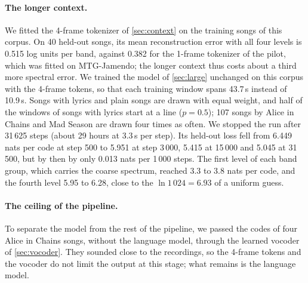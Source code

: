\paragraph{The longer context.} We fitted the 4-frame tokenizer of
\cref{sec:context} on the training songs of this corpus. On 40 held-out songs,
its mean reconstruction error with all four levels is 0.515 log units per
band, against 0.382 for the 1-frame tokenizer of the pilot, which was fitted
on MTG-Jamendo; the longer context thus costs about a third more spectral
error. We trained the model of \cref{sec:large} unchanged on this corpus with
the 4-frame tokens, so that each training window spans 43.7\,s instead of
10.9\,s. Songs with lyrics and plain songs are drawn with equal weight, and
half of the windows of songs with lyrics start at a line ($p = 0.5$); 107
songs by Alice in Chains and Mad Season are drawn four times as often. We
stopped the run after 31\,625 steps (about 29 hours at 3.3\,s per step). Its
held-out loss fell from 6.449 nats per code at step 500 to 5.951 at step
3\,000, 5.415 at 15\,000 and 5.045 at 31\,500, but by then by only 0.013 nats
per 1\,000 steps. The first level of each band group, which carries the coarse
spectrum, reached 3.3 to 3.8 nats per code, and the fourth level 5.95 to
6.28, close to the $\ln 1\,024 = 6.93$ of a uniform guess.

\paragraph{The ceiling of the pipeline.} To separate the model from the rest
of the pipeline, we passed the codes of four Alice in Chains songs, without
the language model, through the learned vocoder of \cref{sec:vocoder}. They
sounded close to the recordings, so the 4-frame tokens and the vocoder do not
limit the output at this stage; what remains is the language model.

